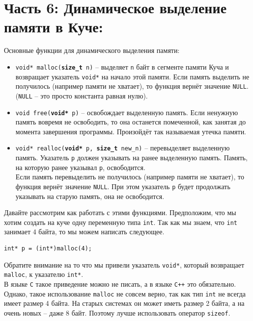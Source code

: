 \documentclass{article}
\begin{document}
\section*{Часть 6: Динамическое выделение памяти в Куче:}
Основные функции для динамического выделения памяти:
\begin{itemize}
\item \texttt{void* malloc(\textbf{size\_t} n)} -- выделяет \texttt{n} байт в сегменте памяти Куча и возвращает указатель \texttt{void*}
на начало этой памяти. Если память выделить не получилось (например памяти не хватает), то функция вернёт значение \texttt{NULL}. (\texttt{NULL} -- это просто константа равная нулю). \\
\item \texttt{void free(\textbf{void*} p)} -- освобождает выделенную память. Если ненужную память вовремя не освободить, то она останется помеченной, как занятая до момента завершения программы. Произойдёт так называемая утечка памяти.\\
\item \texttt{void* realloc(\textbf{void*} p, \textbf{size\_t} new\_n)} -- перевыделяет выделенную память. Указатель \texttt{p} должен указывать на ранее выделенную память. Память, на которую ранее указывал \texttt{p}, освободится. \\
Если память перевыделить не получилось (например памяти не хватает), то функция вернёт значение \texttt{NULL}. При этом указатель \texttt{p} будет продолжать указывать на старую память, она не освободится.\\
\end{itemize}

Давайте рассмотрим как работать с этими функциями. Предположим, что мы хотим создать на куче одну переменную типа \texttt{int}. Так как мы знаем, что \texttt{int} занимает 4 байта, то мы можем написать следующее.
\begin{lstlisting}
int* p = (int*)malloc(4);
\end{lstlisting}
Обратите внимание на то что мы привели указатель \texttt{void*}, который возвращает \texttt{malloc}, к указателю \texttt{int*}.\\
В языке \texttt{C} такое приведение можно не писать, а в языке \texttt{C++} это обязательно. Однако, такое использование \texttt{malloc} не совсем верно, так как тип \texttt{int} не всегда имеет размер 4 байта. На старых системах он может иметь размер 2 байта, а на очень новых -- даже 8 байт. Поэтому лучше использовать оператор \texttt{sizeof}.\\
\end{document}
